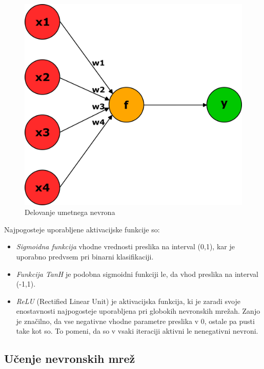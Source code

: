 \documentclass[cover]{thesis}
\begin{document}
\begin{figure}[H]
    \includegraphics[width=\textwidth]{artificialNeuron.png}
    \caption{Delovanje umetnega nevrona}\label{fig:umetniNevron}
\end{figure}

Najpogosteje uporabljene aktivacijske funkcije so:
\begin{itemize}
    \item \emph{Sigmoidna funkcija} vhodne vrednosti preslika na interval (0,1), kar je uporabno predvsem pri binarni klasifikaciji.
    \item \emph{Funkcija TanH} je podobna sigmoidni funkciji le, da vhod preslika na interval (-1,1).
    \item \emph{ReLU} (Rectified Linear Unit) je aktivacijska funkcija, ki je zaradi svoje enostavnosti najpogosteje uporabljena pri globokih nevronskih mrežah. Zanjo je značilno, da vse negativne vhodne parametre preslika v 0, ostale pa pusti take kot so. To pomeni, da so v vsaki iteraciji aktivni le nenegativni nevroni.
\end{itemize}

\subsection{Učenje nevronskih mrež}
\end{document}
